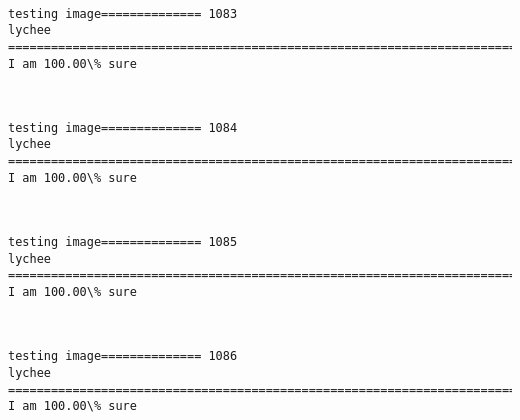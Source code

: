 \documentclass[11pt]{article}
\begin{document}
    \begin{center}
    \end{center}
    { \hspace*{\fill} \\}
    
    \begin{Verbatim}[commandchars=\\\{\}]
testing image============== 1083
lychee
============================================================================
I am 100.00\% sure

    \end{Verbatim}

    \begin{center}
    \end{center}
    { \hspace*{\fill} \\}
    
    \begin{Verbatim}[commandchars=\\\{\}]
testing image============== 1084
lychee
============================================================================
I am 100.00\% sure

    \end{Verbatim}

    \begin{center}
    \end{center}
    { \hspace*{\fill} \\}
    
    \begin{Verbatim}[commandchars=\\\{\}]
testing image============== 1085
lychee
============================================================================
I am 100.00\% sure

    \end{Verbatim}

    \begin{center}
    \end{center}
    { \hspace*{\fill} \\}
    
    \begin{Verbatim}[commandchars=\\\{\}]
testing image============== 1086
lychee
============================================================================
I am 100.00\% sure

    \end{Verbatim}
\end{document}

